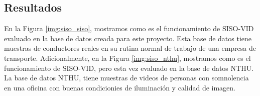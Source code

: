 \documentclass{article}
\begin{document}
	\subsection{Resultados}
	
	En la Figura \ref{img:siso_siso}, mostramos como es el funcionamiento de SISO-VID evaluado en la base de datos creada para este proyecto. Esta base de datos tiene muestras de conductores reales en su rutina normal de trabajo de una empresa de transporte. Adicionalmente, en la Figura \ref{img:siso_nthu}, mostramos como es el funcionamiento de SISO-VID, pero esta vez evaluado en la base de datos NTHU. La base de datos NTHU, tiene muestras de videos de personas con somnolencia en una oficina con buenas condicionies de iluminación y calidad de imagen.\\
	
\end{document}
